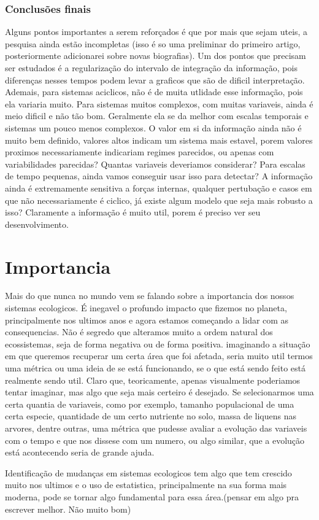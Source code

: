 \documentclass{report}[12pt]
\begin{document}
\subsection{Conclusões finais}
Alguns pontos importantes a serem reforçados é que por mais que sejam uteis, a pesquisa ainda estão
incompletas (isso é so uma preliminar do primeiro artigo, posteriormente adicionarei sobre novas biografias).
Um dos pontos que precisam ser estudados é a regularização do intervalo de integração da informação, pois
diferenças nesses tempos podem levar a graficos que são de dificil interpretação. Ademais, para sistemas
aciclicos, não é de muita utlidade esse informação, pois ela variaria muito. Para sistemas muitos complexos,
com muitas variaveis, ainda é meio dificil e não tão bom. Geralmente ela se da melhor com escalas temporais
e sistemas um pouco menos complexos. O valor em si da informação ainda não é muito bem definido, valores
altos indicam um sistema mais estavel, porem valores proximos necessariamente indicariam regimes parecidos,
ou apenas com variabilidades parecidas? Quantas variaveis deveriamos considerar? Para escalas de tempo
pequenas, ainda vamos conseguir usar isso para detectar? A informação ainda é extremamente sensitiva
a forças internas, qualquer pertubação e casos em que não necessariamente é ciclico, já existe algum
modelo que seja mais robusto a isso? Claramente a informação é muito util, porem é preciso ver seu
desenvolvimento.
\chapter{Importancia}
Mais do que nunca no mundo vem se falando sobre a importancia dos nossos sistemas ecologicos. É
inegavel o profundo impacto que fizemos no planeta, principalmente nos ultimos anos e agora estamos
começando a lidar com as consequencias. Não é segredo que alteramos muito a ordem natural dos
ecossistemas, seja de forma negativa ou de forma positiva. imaginando a situação em que queremos
recuperar um certa área que foi afetada, seria muito util termos uma métrica ou uma ideia de se está
funcionando, se o que está sendo feito está realmente sendo util. Claro que, teoricamente, apenas
visualmente poderiamos tentar imaginar, mas algo que seja mais certeiro é desejado. Se selecionarmos
uma certa quantia de variaveis, como por exemplo, tamanho populacional de uma certa especie,
quantidade de um certo nutriente no solo, massa de liquens nas arvores, dentre outras, uma métrica
que pudesse avaliar a evolução das variaveis com o tempo e que nos dissese com um numero, ou algo
similar, que a evolução está acontecendo seria de grande ajuda. \par

Identificação de mudanças em sistemas ecologicos tem algo que tem crescido muito nos ultimos e o uso
de estatistica, principalmente na sua forma mais moderna, pode se tornar algo fundamental para essa
área.(pensar em algo pra escrever melhor. Não muito bom)


%
\end{document}
